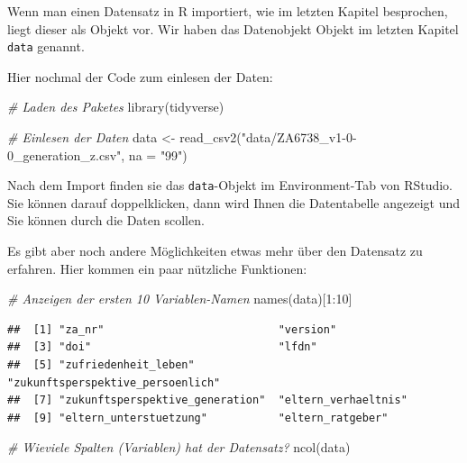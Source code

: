 \documentclass[
]{book}
\newenvironment{Shaded}{\begin{snugshade}}{\end{snugshade}}
\newcommand{\AttributeTok}[1]{\textcolor[rgb]{0.77,0.63,0.00}{#1}}
\newcommand{\CommentTok}[1]{\textcolor[rgb]{0.56,0.35,0.01}{\textit{#1}}}
\newcommand{\DecValTok}[1]{\textcolor[rgb]{0.00,0.00,0.81}{#1}}
\newcommand{\FunctionTok}[1]{\textcolor[rgb]{0.00,0.00,0.00}{#1}}
\newcommand{\NormalTok}[1]{#1}
\newcommand{\OtherTok}[1]{\textcolor[rgb]{0.56,0.35,0.01}{#1}}
\newcommand{\SpecialCharTok}[1]{\textcolor[rgb]{0.00,0.00,0.00}{#1}}
\newcommand{\StringTok}[1]{\textcolor[rgb]{0.31,0.60,0.02}{#1}}
\begin{document}
Wenn man einen Datensatz in R importiert, wie im letzten Kapitel besprochen, liegt dieser als Objekt vor. Wir haben das Datenobjekt Objekt im letzten Kapitel \texttt{data} genannt.

Hier nochmal der Code zum einlesen der Daten:

\begin{Shaded}
\begin{Highlighting}[]
\CommentTok{\# Laden des Paketes}
\FunctionTok{library}\NormalTok{(tidyverse)}

\CommentTok{\# Einlesen der Daten}
\NormalTok{data }\OtherTok{\textless{}{-}} \FunctionTok{read\_csv2}\NormalTok{(}\StringTok{"data/ZA6738\_v1{-}0{-}0\_generation\_z.csv"}\NormalTok{, }\AttributeTok{na =} \StringTok{"99"}\NormalTok{)}
\end{Highlighting}
\end{Shaded}

Nach dem Import finden sie das \texttt{data}-Objekt im Environment-Tab von RStudio. Sie können darauf doppelklicken, dann wird Ihnen die Datentabelle angezeigt und Sie können durch die Daten scollen.

Es gibt aber noch andere Möglichkeiten etwas mehr über den Datensatz zu erfahren. Hier kommen ein paar nützliche Funktionen:

\begin{Shaded}
\begin{Highlighting}[]
\CommentTok{\# Anzeigen der ersten 10 Variablen{-}Namen}
\FunctionTok{names}\NormalTok{(data)[}\DecValTok{1}\SpecialCharTok{:}\DecValTok{10}\NormalTok{]}
\end{Highlighting}
\end{Shaded}

\begin{verbatim}
##  [1] "za_nr"                           "version"                        
##  [3] "doi"                             "lfdn"                           
##  [5] "zufriedenheit_leben"             "zukunftsperspektive_persoenlich"
##  [7] "zukunftsperspektive_generation"  "eltern_verhaeltnis"             
##  [9] "eltern_unterstuetzung"           "eltern_ratgeber"
\end{verbatim}

\begin{Shaded}
\begin{Highlighting}[]
\CommentTok{\# Wieviele Spalten (Variablen) hat der Datensatz?}
\FunctionTok{ncol}\NormalTok{(data)}
\end{Highlighting}
\end{Shaded}
\end{document}
